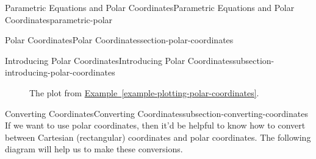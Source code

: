 \documentclass[oneside,10pt,]{book}
\numberwithin{equation}{section}
\begin{document}
\begin{chapterptx}{Parametric Equations and Polar Coordinates}{}{Parametric Equations and Polar Coordinates}{}{}{parametric-polar}
\begin{sectionptx}{Polar Coordinates}{}{Polar Coordinates}{}{}{section-polar-coordinates}
\begin{subsectionptx}{Introducing Polar Coordinates}{}{Introducing Polar Coordinates}{}{}{subsection-introducing-polar-coordinates}
\begin{figure}
{
}
\caption{The plot from \hyperref[example-plotting-polar-coordinates]{Example~\ref{example-plotting-polar-coordinates}}.\label{figure-example-polar-coords}}
\end{figure}
\end{subsectionptx}
%
%
\typeout{************************************************}
\typeout{************************************************}
%
\begin{subsectionptx}{Converting Coordinates}{}{Converting Coordinates}{}{}{subsection-converting-coordinates}
\hypertarget{p-1019}{}%
If we want to use polar coordinates, then it'd be helpful to know how to convert between Cartesian (rectangular) coordinates and polar coordinates. The following diagram will help us to make these conversions.%
\begin{figure}
\centering
{
}
\end{figure}
\end{subsectionptx}
\end{sectionptx}
\end{chapterptx}
\end{document}
